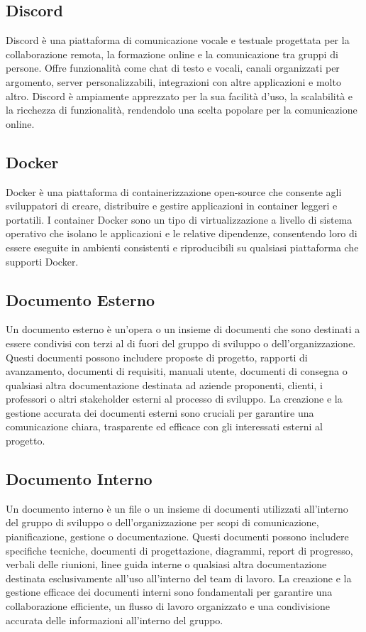 \subsection{Discord} 
Discord è una piattaforma di comunicazione vocale e testuale progettata per la collaborazione remota, la formazione online e la comunicazione tra gruppi di persone. Offre funzionalità come chat di testo e vocali, canali organizzati per argomento, server personalizzabili, integrazioni con altre applicazioni e molto altro. Discord è ampiamente apprezzato per la sua facilità d'uso, la scalabilità e la ricchezza di funzionalità, rendendolo una scelta popolare per la comunicazione online.
\subsection{Docker} 
Docker è una piattaforma di containerizzazione open-source che consente agli sviluppatori di creare, distribuire e gestire applicazioni in container leggeri e portatili. I container Docker sono un tipo di virtualizzazione a livello di sistema operativo che isolano le applicazioni e le relative dipendenze, consentendo loro di essere eseguite in ambienti consistenti e riproducibili su qualsiasi piattaforma che supporti Docker.
\subsection{Documento Esterno} 
Un documento esterno è un'opera o un insieme di documenti che sono destinati a essere condivisi con terzi al di fuori del gruppo di sviluppo o dell'organizzazione. Questi documenti possono includere proposte di progetto, rapporti di avanzamento, documenti di requisiti, manuali utente, documenti di consegna o qualsiasi altra documentazione destinata ad aziende proponenti, clienti, i professori o altri stakeholder esterni al processo di sviluppo. La creazione e la gestione accurata dei documenti esterni sono cruciali per garantire una comunicazione chiara, trasparente ed efficace con gli interessati esterni al progetto.
\subsection{Documento Interno} 
Un documento interno è un file o un insieme di documenti utilizzati all'interno del gruppo di sviluppo o dell'organizzazione per scopi di comunicazione, pianificazione, gestione o documentazione. Questi documenti possono includere specifiche tecniche, documenti di progettazione, diagrammi, report di progresso, verbali delle riunioni, linee guida interne o qualsiasi altra documentazione destinata esclusivamente all'uso all'interno del team di lavoro. La creazione e la gestione efficace dei documenti interni sono fondamentali per garantire una collaborazione efficiente, un flusso di lavoro organizzato e una condivisione accurata delle informazioni all'interno del gruppo.
